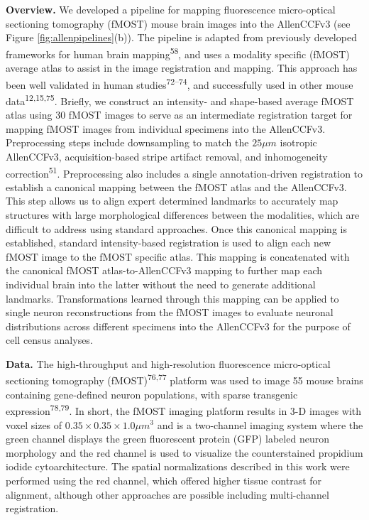 \documentclass[
  12pt,
]{article}
\begin{document}
\textbf{Overview.} We developed a pipeline for mapping fluorescence
micro-optical sectioning tomography (fMOST) mouse brain images into the
AllenCCFv3 (see Figure \ref{fig:allenpipelines}(b)). The pipeline is
adapted from previously developed frameworks for human brain
mapping\textsuperscript{58}, and uses a modality specific (fMOST)
average atlas to assist in the image registration and mapping. This
approach has been well validated in human
studies\textsuperscript{72--74}, and successfully used in other mouse
data\textsuperscript{12,15,75}. Briefly, we construct an intensity- and
shape-based average fMOST atlas using 30 fMOST images to serve as an
intermediate registration target for mapping fMOST images from
individual specimens into the AllenCCFv3. Preprocessing steps include
downsampling to match the \(25 \mu m\) isotropic AllenCCFv3,
acquisition-based stripe artifact removal, and inhomogeneity
correction\textsuperscript{51}. Preprocessing also includes a single
annotation-driven registration to establish a canonical mapping between
the fMOST atlas and the AllenCCFv3. This step allows us to align expert
determined landmarks to accurately map structures with large
morphological differences between the modalities, which are difficult to
address using standard approaches. Once this canonical mapping is
established, standard intensity-based registration is used to align each
new fMOST image to the fMOST specific atlas. This mapping is
concatenated with the canonical fMOST atlas-to-AllenCCFv3 mapping to
further map each individual brain into the latter without the need to
generate additional landmarks. Transformations learned through this
mapping can be applied to single neuron reconstructions from the fMOST
images to evaluate neuronal distributions across different specimens
into the AllenCCFv3 for the purpose of cell census analyses.

\textbf{Data.} The high-throughput and high-resolution fluorescence
micro-optical sectioning tomography (fMOST)\textsuperscript{76,77}
platform was used to image 55 mouse brains containing gene-defined
neuron populations, with sparse transgenic
expression\textsuperscript{78,79}. In short, the fMOST imaging platform
results in 3-D images with voxel sizes of \(0.35 \times 0.35 \times 1.0
\mu m^3\) and is a two-channel imaging system where the green channel
displays the green fluorescent protein (GFP) labeled neuron morphology
and the red channel is used to visualize the counterstained propidium
iodide cytoarchitecture. The spatial normalizations described in this
work were performed using the red channel, which offered higher tissue
contrast for alignment, although other approaches are possible including
multi-channel registration.
\end{document}
